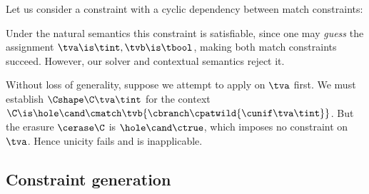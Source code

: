 \documentclass[acmsmall,screen,nonacm%
\Anonymous{,anonymous}{}%
\Final{}{,review}%
]{acmart}
\begin{document}
\begin{example}
  Let us consider a constraint with a cyclic dependency between match
  constraints:
  Under the natural semantics this constraint is satisfiable, since one may
  \emph{guess} the assignment $\tva \is \tint, \tvb \is \tbool$,
  making both match constraints succeed. However, our solver and contextual semantics
  reject it.


  Without loss of generality, suppose we attempt to apply  on
  $\tva$ first. We must establish $\Cshape \C \tva \tint$ for the context $\C
  \is \hole \cand \cmatch \tvb {\cbranch \cpatwild {\cunif \tva \tint}}$. But
  the erasure $\cerase \C$ is $\hole \cand \ctrue$, which imposes no constraint on
  $\tva$. Hence unicity fails and  is inapplicable.

\end{example}
\subsection{Constraint generation}
\label{sec/oml/constraints}
\end{document}

